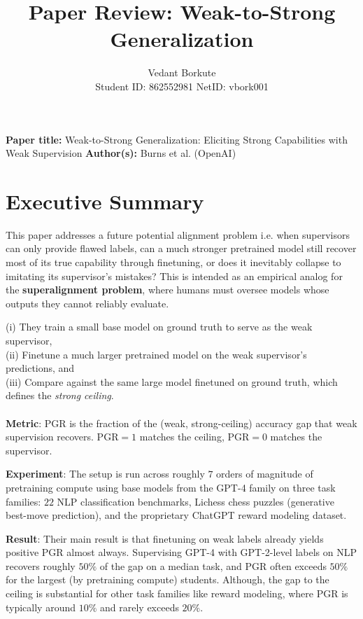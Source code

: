 \documentclass{article}
\title{Paper Review: Weak-to-Strong Generalization}
\author{
  Vedant Borkute \\
  Student ID: 862552981
  NetID: vbork001
}
\begin{document}
\maketitle

\textbf{Paper title:} Weak-to-Strong Generalization: Eliciting Strong Capabilities with Weak Supervision 
\textbf{Author(s):} Burns et al. (OpenAI)

\section{Executive Summary}

This paper addresses a future potential alignment problem i.e. when supervisors can only provide flawed labels, can a much stronger pretrained model still recover most of its true capability through finetuning, or does it inevitably collapse to imitating its supervisor's mistakes? This is intended as an empirical analog for the \textbf{superalignment problem}, where humans must oversee models whose outputs they cannot reliably evaluate.

(i) They train a small base model on ground truth to serve as the weak supervisor, \\ (ii) Finetune a much larger pretrained model on the weak supervisor's predictions, and \\
(iii) Compare against the same large model finetuned on ground truth, which defines the \textit{strong ceiling}. \\ \\
\textbf{Metric}:
PGR is the fraction of the (weak, strong-ceiling) accuracy gap that weak supervision recovers. PGR$=1$ matches the ceiling, PGR$=0$ matches the supervisor. 

\textbf{Experiment}: The setup is run across roughly $7$ orders of magnitude of pretraining compute using base models from the GPT-4 family on three task families: $22$ NLP classification benchmarks, Lichess chess puzzles (generative best-move prediction), and the proprietary ChatGPT reward modeling dataset.

\textbf{Result}: Their main result is that finetuning on weak labels already yields positive PGR almost always. Supervising GPT-4 with GPT-2-level labels on NLP recovers roughly $50\%$ of the gap on a median task, and PGR often exceeds $50\%$ for the largest (by pretraining compute) students. Although, the gap to the ceiling is substantial for other task families like reward modeling, where PGR is typically around $10\%$ and rarely exceeds $20\%$. 
\end{document}
